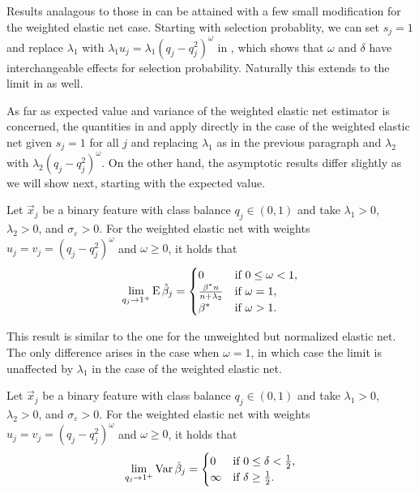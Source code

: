 Results analagous to those in  can be attained with a few
small modification for the weighted elastic net case. Starting with selection probablity,
we can set \(s_j = 1\) and replace \(\lambda_1\) with \(\lambda_1 u_j =
\lambda_1(q_j-q_j^2)^\omega\) in , which shows that
\(\omega\) and \(\delta\) have interchangeable effects for selection probability. Naturally
this extends to the limit in  as well.

As far as expected value and variance of the weighted elastic net estimator is concerned,
the quantities in  and  apply
directly in the case of the weighted elastic net given \(s_j = 1\) for all \(j\) and
replacing \(\lambda_1\) as in the previous paragraph and \(\lambda_2\) with \(\lambda_2
(q_j - q_j^2)^\omega\). On the other hand, the asymptotic results differ slightly as we
will show next, starting with the expected value.

\begin{theorem}
  \label{thm:weighted-elasticnet-bias}
  Let \(\vec{x}_j\) be a binary feature with class balance \(q_j \in (0, 1)\) and take
  \(\lambda_1 > 0\), \(\lambda_2 > 0\), and \(\sigma_\varepsilon > 0\). For the
  weighted elastic net with weights \(u_j = v_j = (q_j-q_j^2)^\omega\) and \(\omega \geq 0\), it holds that
  \[
    \lim_{q_j \rightarrow 1^+} \operatorname{E} \hat{\beta}_j =
    \begin{cases}
      0                              & \text{if } 0 \leq \omega < 1, \\
      \frac{\beta^*n}{n + \lambda_2} & \text{if } \omega = 1,        \\
      \beta^*                        & \text{if } \omega > 1.
    \end{cases}
  \]
\end{theorem}

This result is similar to the one for the unweighted but normalized elastic net. The only
difference arises in the case when \(\omega = 1\), in which case the limit is unaffected by
\(\lambda_1\) in the case of the weighted elastic net.

\begin{theorem}
  \label{thm:weighted-elasticnet-variance}
  Let \(\vec{x}_j\) be a binary feature with class balance \(q_j \in (0, 1)\) and take
  \(\lambda_1 > 0\), \(\lambda_2 > 0\), and \(\sigma_\varepsilon > 0\). For the
  weighted elastic net with weights \(u_j = v_j = (q_j-q_j^2)^\omega\) and \(\omega \geq 0\), it holds that
  \[
    \lim_{q_j \rightarrow 1^+} \operatorname{Var} \hat{\beta}_j =
    \begin{cases}
      0      & \text{if } 0 \leq \delta < \frac{1}{2}, \\
      \infty & \text{if } \delta \geq \frac{1}{2}.
    \end{cases}
  \]
\end{theorem}

